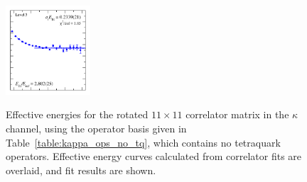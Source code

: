 \begin{figure}
  \includegraphics[width=0.28\textwidth]{figures/spectrum_a1g/no_tq/fits/fit_5.pdf}\\
  \caption[Effective energies for the rotated $11\times 11$ correlator matrix in the $\kappa$ channel, using the operator basis given in Table~\ref{table:kappa_ops_no_tq}.]{Effective energies for the rotated $11\times 11$ correlator matrix in the $\kappa$ channel, using the operator basis given in Table~\ref{table:kappa_ops_no_tq}, which contains no tetraquark operators. Effective energy curves calculated from correlator fits are overlaid, and fit results are shown.}
  \label{fig:kappa_no_tq_grid}
\end{figure}

